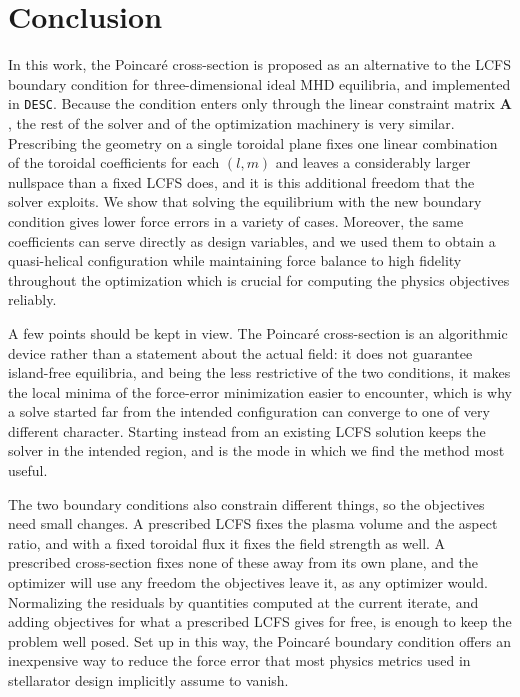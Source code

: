 \documentclass{jpp}
\begin{document}
\section{Conclusion}
In this work, the Poincaré cross-section is proposed as an alternative to the LCFS boundary condition for three-dimensional ideal MHD equilibria, and implemented in \texttt{DESC}. Because the condition enters only through the linear constraint matrix $\mathbf{A}$, the rest of the solver and of the optimization machinery is very similar. Prescribing the geometry on a single toroidal plane fixes one linear combination of the toroidal coefficients for each $(l,m)$ and leaves a considerably larger nullspace than a fixed LCFS does, and it is this additional freedom that the solver exploits. We show that solving the equilibrium with the new boundary condition gives lower force errors in a variety of cases. Moreover, the same coefficients can serve directly as design variables, and we used them to obtain a quasi-helical configuration while maintaining force balance to high fidelity throughout the optimization which is crucial for computing the physics objectives reliably.

A few points should be kept in view. The Poincaré cross-section is an algorithmic device rather than a statement about the actual field: it does not guarantee island-free equilibria, and being the less restrictive of the two conditions, it makes the local minima of the force-error minimization easier to encounter, which is why a solve started far from the intended configuration can converge to one of very different character. Starting instead from an existing LCFS solution keeps the solver in the intended region, and is the mode in which we find the method most useful.

The two boundary conditions also constrain different things, so the objectives need small changes. A prescribed LCFS fixes the plasma volume and the aspect ratio, and with a fixed toroidal flux it fixes the field strength as well. A prescribed cross-section fixes none of these away from its own plane, and the optimizer will use any freedom the objectives leave it, as any optimizer would. Normalizing the residuals by quantities computed at the current iterate, and adding objectives for what a prescribed LCFS gives for free, is enough to keep the problem well posed. Set up in this way, the Poincaré boundary condition offers an inexpensive way to reduce the force error that most physics metrics used in stellarator design implicitly assume to vanish.
\end{document}
